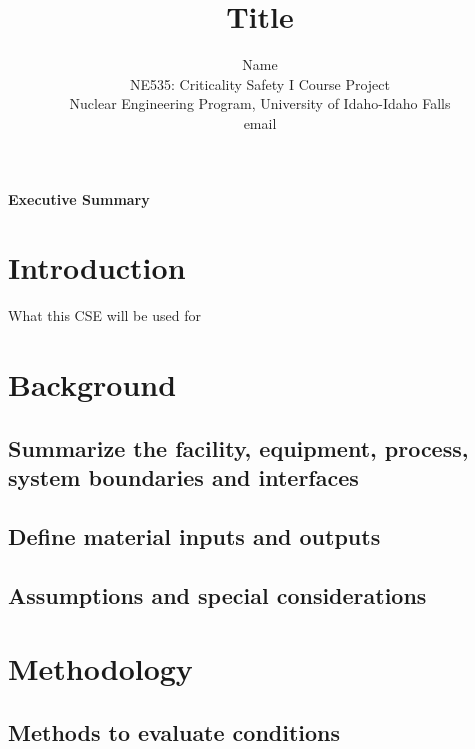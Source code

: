 \documentclass[11pt,a4paper]{article}
\begin{document}
\begin{titlepage}
    \title{Title}
    \author{
        Name \\
        NE535: Criticality Safety I Course Project \\
        Nuclear Engineering Program, University of Idaho-Idaho Falls \\
        email 
    }
\clearpage %
\maketitle
\thispagestyle{empty} %
\end{titlepage}

\onehalfspacing
\linenumbers
\pagewiselinenumbers
\modulolinenumbers[3] %

\noindent\Large{\textbf{Executive Summary}} \\

\newpage

\section{Introduction}
What this CSE will be used for

\newpage

\section{Background}
\subsection{Summarize the facility, equipment, process, system boundaries and interfaces}

\subsection{Define material inputs and outputs}

\subsection{Assumptions and special considerations}

\newpage

\section{Methodology}
\subsection{Methods to evaluate conditions}
\end{document}
